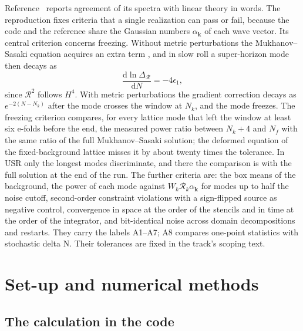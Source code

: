 \documentclass[aps,prd,twocolumn,10pt,superscriptaddress,nofootinbib,longbibliography,floatfix]{revtex4-2}
\newcommand{\dd}{\mathrm{d}}
\begin{document}
Reference~\cite{Launay:2025sinr} reports agreement of its spectra with linear theory in words. The reproduction fixes criteria that a single realization can pass or fail, because the code and the reference share the Gaussian numbers $\alpha_{\bm k}$ of each wave vector. Its central criterion concerns freezing. Without metric perturbations the Mukhanov--Sasaki equation acquires an extra term \cite{Barker:2026lattice}, and in slow roll a super-horizon mode then decays as
\begin{equation}\label{eq:decay}
\frac{\dd\ln\Delta_\mathcal{R}}{\dd N}=-4\epsilon_1,
\end{equation}
since $\mathcal{R}^2$ follows $H^4$. With metric perturbations the gradient correction decays as $e^{-2(N-N_k)}$ after the mode crosses the window at $N_k$, and the mode freezes. The freezing criterion compares, for every lattice mode that left the window at least six e-folds before the end, the measured power ratio between $N_k+4$ and $N_f$ with the same ratio of the full Mukhanov--Sasaki solution; the deformed equation of the fixed-background lattice misses it by about twenty times the tolerance. In USR only the longest modes discriminate, and there the comparison is with the full solution at the end of the run. The further criteria are: the box means of the background, the power of each mode against $W_k\mathcal{R}_k\alpha_{\bm k}$ for modes up to half the noise cutoff, second-order constraint violations with a sign-flipped source as negative control, convergence in space at the order of the stencils and in time at the order of the integrator, and bit-identical noise across domain decompositions and restarts. They carry the labels A1--A7; A8 compares one-point statistics with stochastic delta N. Their tolerances are fixed in the track's scoping text.

\section{Set-up and numerical methods}\label{sec:setup}

\subsection{The calculation in the code}\label{sec:code}
\end{document}
